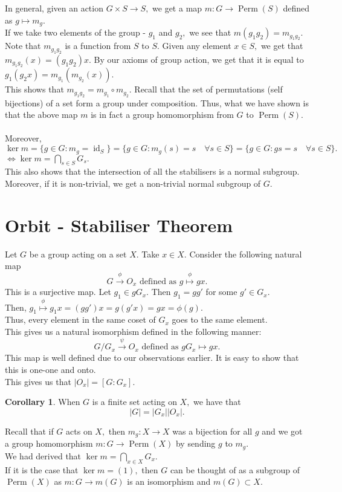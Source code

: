 \documentclass[12 pt, a4paper, toc=graduated, oneside]{article}
\theoremstyle{definition}
\newtheorem{cor}{Corollary}
\begin{document}
In general, given an action $G \times S \to S,$ we get a map $m : G \to \operatorname{Perm}(S)$ defined as $g \mapsto m_g.$\\
If we take two elements of the group - $g_1$ and $g_2,$ we see that $m(g_1g_2) = m_{g_1g_2}.$\\
Note that $m_{g_1g_2}$ is a function from $S$ to $S.$ Given any element $x \in S,$ we get that $m_{g_1g_2}(x) = (g_1g_2)x.$ By our axioms of group action, we get that it is equal to $g_1(g_2 x) = m_{g_1}(m_{g_2}(x)).$\\
This shows that $m_{g_1g_2} = m_{g_1}\circ m_{g_2}.$ Recall that the set of permutations (self bijections) of a set form a group under composition. Thus, what we have shown is that the above map $m$ is in fact a group homomorphism from $G$ to $\operatorname{Perm}(S).$\\~\\
Moreover, $\ker m = \{g \in G : m_g = \operatorname{id}_S\} = \{g \in G : m_g(s) = s \quad \forall s \in S\} = \{g \in G : gs = s \quad \forall s \in S\}.$\\
$\iff \ker m = \displaystyle\bigcap_{s \in S}G_s.$\\
This also shows that the intersection of all the stabilisers is a normal subgroup. Moreover, if it is non-trivial, we get a non-trivial normal subgroup of $G.$

\section{Orbit - Stabiliser Theorem}

Let $G$ be a group acting on a set $X.$ Take $x \in X.$ Consider the following natural map
\[G \overset{\phi}{\longrightarrow}O_x \text{ defined as }g \overset{\phi}{\mapsto}gx.\]
This is a surjective map. Let $g_1 \in gG_x.$ Then $g_1 = gg'$ for some $g' \in G_x.$\\
Then, $g_1 \overset{\phi}{\mapsto}g_1x = (gg')x = g(g'x) = gx = \phi(g).$\\
Thus, every element in the same coset of $G_x$ goes to the same element.\\
This gives us a natural isomorphism defined in the following manner:
\[G/G_x \overset{\psi}{\longrightarrow}O_x \text{ defined as }gG_x \mapsto gx.\]
This map is well defined due to our observations earlier. It is easy to show that this is one-one and onto.\\
This gives us that $|O_x| = [G:G_x].$
\begin{cor}
	When $G$ is a finite set acting on $X,$ we have that
	\[|G| = |G_x||O_x|.\]
\end{cor}
Recall that if $G$ acts on $X,$ then $m_g : X \to X$ was a bijection for all $g$ and we got a group homomorphism $m : G \to \operatorname{Perm}(X)$ by sending $g$ to $m_g.$ \\
We had derived that $\ker m = \displaystyle\bigcap_{x \in X}G_x.$\\
If it is the case that $\ker m = (1),$ then $G$ can be thought of as a subgroup of $\operatorname{Perm}(X)$ as $m:G \to m(G)$ is an isomorphism and $m(G) \subset X.$
\end{document}
